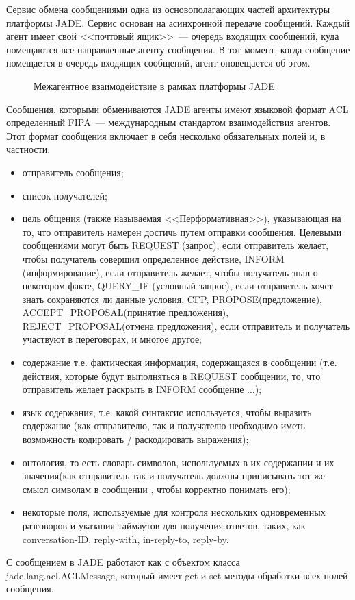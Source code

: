 Сервис обмена сообщениями одна из основополагающих частей архитектуры платформы JADE. Сервис основан на асинхронной передаче сообщений. Каждый агент имеет свой <<почтовый ящик>>~--- очередь входящих сообщений, куда помещаются все направленные агенту сообщения. В тот момент, когда сообщение помещается в очередь входящих сообщений, агент оповещается об этом.
\begin{figure}[h]
\caption{Межагентное взаимодействие в рамках платформы JADE}
\label{2:acl}
\end{figure}
Сообщения, которыми обмениваются JADE агенты имеют языковой формат ACL определенный FIPA~--- международным стандартом взаимодействия агентов. Этот формат сообщения включает в себя несколько обязательных полей и, в частности:
\begin{itemize}
\item отправитель сообщения;
\item список получателей;
\item цель общения (также называемая <<Перформативная>>), указывающая на то, что отправитель намерен достичь путем отправки сообщения. Целевыми сообщениями могут быть REQUEST (запрос), если отправитель желает, чтобы получатель совершил определенное действие, INFORM (информирование), если отправитель желает, чтобы получатель знал о некотором факте, QUERY\_IF (условный запрос), если отправитель хочет знать сохраняются ли данные условия, CFP, PROPOSE(предложение), ACCEPT\_PROPOSAL(принятие предложения), REJECT\_PROPOSAL(отмена предложения), если отправитель и получатель участвуют в переговорах, и многое другое; 
\item содержание т.е. фактическая информация, содержащаяся в сообщении (т.е. действия, которые будут выполняться в REQUEST сообщении, то, что отправитель желает раскрыть в INFORM сообщение ...);
\item язык содержания, т.е. какой синтаксис используется, чтобы выразить содержание (как отправителю, так и получателю необходимо иметь возможность кодировать / раскодировать выражения);
\item онтология, то есть словарь символов, используемых в их содержании и их значения(как отправитель так и получатель должны приписывать тот же смысл символам в сообщении , чтобы корректно понимать его);
\item некоторые поля, используемые для контроля нескольких одновременных разговоров и указания таймаутов для получения ответов, таких, как conversation-ID, reply-with, in-reply-to, reply-by. 
\end{itemize}
С сообщением в JADE работают как с объектом класса jade.lang.acl.ACLMessage, который имеет get и set методы обработки всех полей сообщения.

